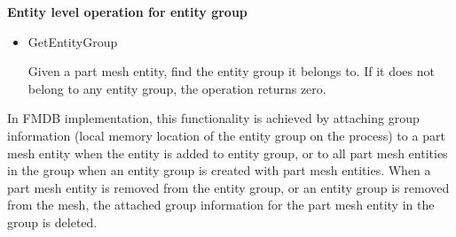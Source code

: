 \textbf{Entity level operation for entity group}
\begin{itemize}
\item GetEntityGroup

Given a part mesh entity, find the entity group it belongs to. If it does not belong to any entity group, the operation returns zero. 
\end{itemize}

In FMDB implementation, this functionality is achieved by attaching
group information (local memory location of the entity group on the
process) to a part mesh entity when the entity is added to entity
group, or to all part mesh entities in the group when an entity group
is created with part mesh entities. When a part mesh entity is removed
from the entity group, or an entity group is removed from the mesh,
the attached group information for the part mesh entity in the group is deleted. 


